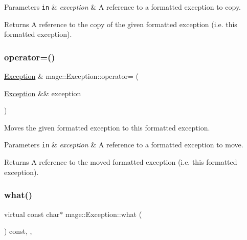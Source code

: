 \begin{DoxyParams}[1]{Parameters}
\mbox{\tt in}  & {\em exception} & A reference to a formatted exception to copy. \\
\hline
\end{DoxyParams}
\begin{DoxyReturn}{Returns}
A reference to the copy of the given formatted exception (i.\+e. this formatted exception). 
\end{DoxyReturn}
\hypertarget{classmage_1_1_exception_aa9305c6bd8836f56ffa970473533f031}{}\label{classmage_1_1_exception_aa9305c6bd8836f56ffa970473533f031} 
\subsubsection{\texorpdfstring{operator=()}{operator=()}\hspace{0.1cm}{\footnotesize\ttfamily [2/2]}}
{\footnotesize\ttfamily \hyperlink{classmage_1_1_exception}{Exception} \& mage\+::\+Exception\+::operator= (\begin{DoxyParamCaption}\item[{\hyperlink{classmage_1_1_exception}{Exception} \&\&}]{exception }\end{DoxyParamCaption})\hspace{0.3cm}{\ttfamily [default]}}

Moves the given formatted exception to this formatted exception.


\begin{DoxyParams}[1]{Parameters}
\mbox{\tt in}  & {\em exception} & A reference to a formatted exception to move. \\
\hline
\end{DoxyParams}
\begin{DoxyReturn}{Returns}
A reference to the moved formatted exception (i.\+e. this formatted exception). 
\end{DoxyReturn}
\hypertarget{classmage_1_1_exception_a2ec064e970c232b09c100e151195a3e4}{}\label{classmage_1_1_exception_a2ec064e970c232b09c100e151195a3e4} 
\subsubsection{\texorpdfstring{what()}{what()}}
{\footnotesize\ttfamily virtual const char$\ast$ mage\+::\+Exception\+::what (\begin{DoxyParamCaption}{ }\end{DoxyParamCaption}) const\hspace{0.3cm}{\ttfamily [override]}, {\ttfamily [virtual]}, {\ttfamily [noexcept]}}


